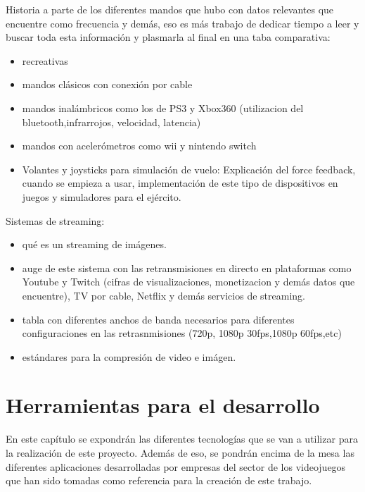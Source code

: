 Historia a parte de los diferentes mandos que hubo con datos relevantes que encuentre como frecuencia y dem\'as, eso es m\'as trabajo de dedicar tiempo a leer y buscar toda esta informaci\'on y plasmarla al final en una taba comparativa:
\begin {itemize}
\item recreativas
\item mandos cl\'asicos con conexi\'on por cable
\item mandos inal\'ambricos como los de PS3 y Xbox360 (utilizacion del bluetooth,infrarrojos, velocidad, latencia)
\item mandos con aceler\'ometros como wii y nintendo switch
\item Volantes y joysticks para simulaci\'on de vuelo: Explicaci\'on del force feedback, cuando se empieza a usar, implementaci\'on de este tipo de dispositivos en juegos y simuladores para el ej\'ercito.
\end {itemize}

Sistemas de streaming:
\begin {itemize}
\item qu\'e es un streaming de im\'agenes.
\item auge de este sistema con las retransmisiones en directo en plataformas como Youtube y Twitch (cifras de visualizaciones, monetizacion y dem\'as datos  que encuentre), TV por cable, Netflix y dem\'as servicios de streaming.
\item tabla con diferentes anchos de banda necesarios para diferentes configuraciones en las retrasnmisiones (720p, 1080p 30fps,1080p 60fps,etc)
\item est\'andares para la compresi\'on de video e im\'agen. 
\end {itemize}


\section{Herramientas para el desarrollo}
\label{cap2:sec:herramientas}

En este cap\'itulo se expondr\'an las diferentes tecnolog\'ias que se van a utilizar para la realizaci\'on de este proyecto. Adem\'as de eso, se pondr\'an encima de la mesa las diferentes aplicaciones desarrolladas por empresas del sector de los videojuegos que han sido tomadas como referencia para la creaci\'on de este trabajo. 
